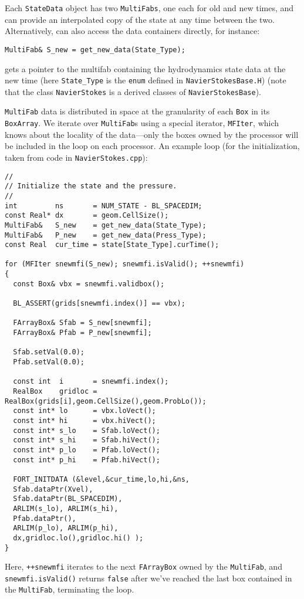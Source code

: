Each {\tt StateData} object has two {\tt MultiFabs}, one each for 
old and new times, and can provide an interpolated copy of the state at any time between the two.
Alternatively, can also access the data containers directly, for instance:
\begin{lstlisting}
MultiFab& S_new = get_new_data(State_Type);
\end{lstlisting}
gets a pointer to the multifab containing the hydrodynamics state data
at the new time (here {\tt State\_Type} is the {\tt enum} defined in 
{\tt NavierStokesBase.H}) (note that the class {\tt NavierStokes} 
is a derived classes of {\tt NavierStokesBase}).

{\tt MultiFab} data is distributed in space at the granularity of 
each {\tt Box} in its {\tt BoxArray}.  We iterate over {\tt MultiFab}s using a special
iterator, {\tt MFIter}, which knows about the locality of the data---only the boxes owned by the
processor will be included in the loop on each processor.  An example loop (for the
initialization, taken from code in {\tt NavierStokes.cpp}):
\begin{lstlisting}
//
// Initialize the state and the pressure.
//
int         ns       = NUM_STATE - BL_SPACEDIM;
const Real* dx       = geom.CellSize();
MultiFab&   S_new    = get_new_data(State_Type);
MultiFab&   P_new    = get_new_data(Press_Type);
const Real  cur_time = state[State_Type].curTime();

for (MFIter snewmfi(S_new); snewmfi.isValid(); ++snewmfi)
{
  const Box& vbx = snewmfi.validbox();

  BL_ASSERT(grids[snewmfi.index()] == vbx);

  FArrayBox& Sfab = S_new[snewmfi];
  FArrayBox& Pfab = P_new[snewmfi];

  Sfab.setVal(0.0);
  Pfab.setVal(0.0);

  const int  i       = snewmfi.index();
  RealBox    gridloc = RealBox(grids[i],geom.CellSize(),geom.ProbLo());
  const int* lo      = vbx.loVect();
  const int* hi      = vbx.hiVect();
  const int* s_lo    = Sfab.loVect();
  const int* s_hi    = Sfab.hiVect();
  const int* p_lo    = Pfab.loVect();
  const int* p_hi    = Pfab.hiVect();

  FORT_INITDATA (&level,&cur_time,lo,hi,&ns,
  Sfab.dataPtr(Xvel),
  Sfab.dataPtr(BL_SPACEDIM),
  ARLIM(s_lo), ARLIM(s_hi),
  Pfab.dataPtr(),
  ARLIM(p_lo), ARLIM(p_hi),
  dx,gridloc.lo(),gridloc.hi() );
}
\end{lstlisting} 
Here, {\tt ++snewmfi} iterates to the next {\tt FArrayBox} owned by the {\tt MultiFab}, 
and {\tt snewmfi.isValid()} returns {\tt false} after we've reached 
the last box contained in the {\tt MultiFab}, terminating the loop.


